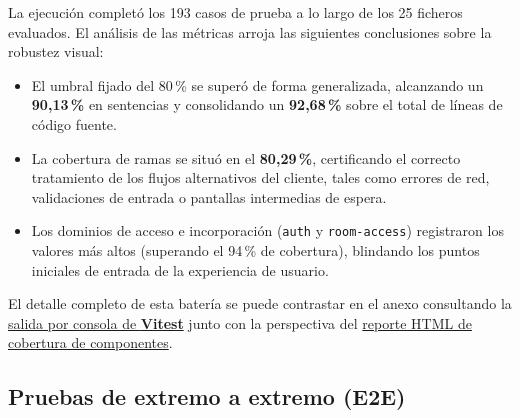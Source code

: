 La ejecución completó los 193 casos de prueba a lo largo de los 25 ficheros evaluados. El análisis de las métricas arroja las siguientes conclusiones sobre la robustez visual:

\begin{itemize}
    \item El umbral fijado del 80\,\% se superó de forma generalizada, alcanzando un \textbf{90{,}13\,\%} en sentencias y consolidando un \textbf{92{,}68\,\%} sobre el total de líneas de código fuente.
    \item La cobertura de ramas se situó en el \textbf{80{,}29\,\%}, certificando el correcto tratamiento de los flujos alternativos del cliente, tales como errores de red, validaciones de entrada o pantallas intermedias de espera.
    \item Los dominios de acceso e incorporación (\texttt{auth} y \texttt{room-access}) registraron los valores más altos (superando el 94\,\% de cobertura), blindando los puntos iniciales de entrada de la experiencia de usuario.
\end{itemize}

El detalle completo de esta batería se puede contrastar en el anexo consultando la \hyperref[ev:terminal_test_componentes]{salida por consola de \textbf{Vitest}} junto con la perspectiva del \hyperref[ev:cobertura_componentes]{reporte HTML de cobertura de componentes}.

\subsection{Pruebas de extremo a extremo (E2E)}\label{sub:resultados_pruebas_e2e}

